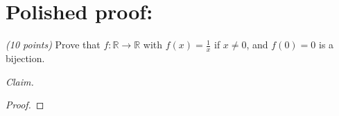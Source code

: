 \documentclass[12pt]{article}
\begin{document}
\section*{Polished proof:} 

\emph{(10 points)} Prove that \( f : \mathbb{R} \to \mathbb{R} \) with \( f(x) = \frac{1}{x} \) if \( x \neq 0 \), and \( f(0) = 0 \) is a bijection.

\noindent \emph{Claim.}

\begin{proof}
\end{proof}
\end{document}
